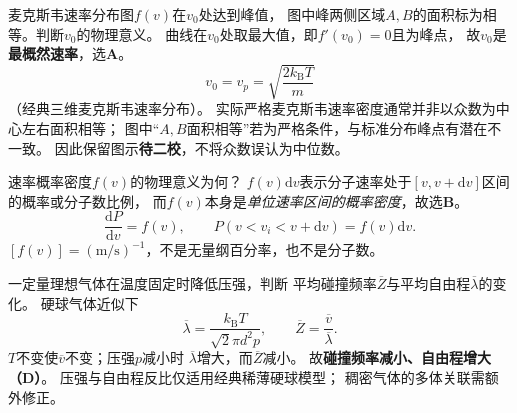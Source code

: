 \problemtext 麦克斯韦速率分布图$f(v)$在$v_0$处达到峰值，
图中峰两侧区域$A,B$的面积标为相等。判断$v_0$的物理意义。
\workings
曲线在$v_0$处取最大值，即$f'(v_0)=0$且为峰点，
故$v_0$是\textbf{最概然速率}，选\textbf{A}。
\[
\boxed{v_0=v_p=\sqrt{\frac{2k_{\mathrm B}T}{m}}}
\]
（经典三维麦克斯韦速率分布）。
\crosscheck 实际严格麦克斯韦速率密度通常并非以众数为中心左右面积相等；
图中“$A,B$面积相等”若为严格条件，与标准分布峰点有潜在不一致。
因此保留图示\textbf{待二校}，不将众数误认为中位数。

\problemtext 速率概率密度$f(v)$的物理意义为何？
\workings
$f(v)\mathrm dv$表示分子速率处于$[v,v+\mathrm dv]$区间的概率或分子数比例，
而$f(v)$本身是\emph{单位速率区间的概率密度}，故选\textbf{B}。
\[
\boxed{\frac{\mathrm dP}{\mathrm dv}=f(v),\qquad
P(v<v_i<v+\mathrm dv)=f(v)\mathrm dv}.
\]
\crosscheck $[f(v)]=(\mathrm{m/s})^{-1}$，不是无量纲百分率，也不是分子数。

\problemtext 一定量理想气体在温度固定时降低压强，判断
平均碰撞频率$\overline Z$与平均自由程$\overline\lambda$的变化。
\workings
硬球气体近似下
\[
\overline\lambda=\frac{k_{\mathrm B}T}
 {\sqrt2\pi d^2p},\qquad
\overline Z=\frac{\overline v}{\overline\lambda}.
\]
$T$不变使$\overline v$不变；压强$p$减小时
$\overline\lambda$增大，而$\overline Z$减小。
故\textbf{碰撞频率减小、自由程增大（D）}。
\crosscheck 压强与自由程反比仅适用经典稀薄硬球模型；
稠密气体的多体关联需额外修正。
